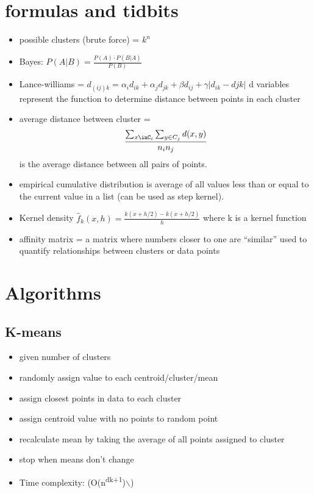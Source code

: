 \documentclass[11pt]{article}
\author{David Lewis}
\date{\today}
\title{}
\begin{document}
\section*{formulas and tidbits}
\label{sec:orgc888eef}
\begin{itemize}
\item possible clusters (brute force) =  \(k^n\)
\item Bayes: \(P(A|B) = \frac{P(A) \cdot P(B|A)}{P(B)}\)
\item Lance-williams = \(d_{(ij)k} = \alpha_id_{ik} + \alpha_jd_{jk} + \beta d_{ij} + \gamma|d_{ik} -
  d{jk}|\) d variables represent the function to determine distance between
points in each cluster
\item average distance between cluster = \[\frac{\sum_{x\inC_i}\sum_{y\in
  C_j}d(x,y)}{n_in_j}\] is the average distance between all pairs of points.
\item empirical cumulative distribution is average of all values less than or equal
to the current value in a list (can be used as step kernel).
\item Kernel density \(\hat f_k(x, h) = \frac{k(x+h/2) - k(x+h/2)}{h}\) where k is a
kernel function
\item affinity matrix = a matrix where numbers closer to one are ``similar'' used to
quantify relationships between clusters or data points
\end{itemize}
\section*{Algorithms}
\label{sec:org2bf41a0}
\subsection*{K-means}
\label{sec:org5b3d057}
\begin{itemize}
\item given number of clusters
\item randomly assign value to each centroid/cluster/mean
\item assign closest points in data to each cluster
\item assign centroid value with no points to random point
\item recalculate mean by taking the average of all points assigned to cluster
\item stop when means don't change
\item Time complexity: (O(n\textsuperscript{dk+1})$\backslash$)
\end{itemize}
\end{document}
